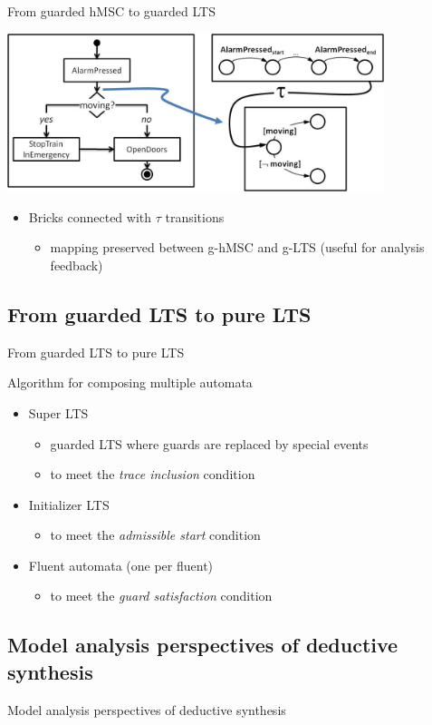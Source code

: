 \begin{frame}{From guarded hMSC to guarded LTS}

  \begin{center}
    \includegraphics[width=11cm]{images/ghmsc2glts_tau.jpg}
  \end{center}
  
  \begin{itemize}
    \item Bricks connected with $\tau$ transitions
    \begin{itemize}
      \item mapping preserved between g-hMSC and g-LTS (useful for analysis feedback)
    \end{itemize}
  \end{itemize}

\end{frame}

\subsection{From guarded LTS to pure LTS}
\begin{frame}{From guarded LTS to pure LTS}

Algorithm for composing multiple automata

\begin{itemize}
\item Super LTS
  \begin{itemize}
    \item guarded LTS where guards are replaced by special events
    \item to meet the \emph{trace inclusion} condition
  \end{itemize}
\item Initializer LTS
  \begin{itemize}
    \item to meet the \emph{admissible start} condition
  \end{itemize}
\item Fluent automata (one per fluent)
  \begin{itemize}
    \item to meet the \emph{guard satisfaction} condition
  \end{itemize}
\end{itemize}

\end{frame}

\subsection{Model analysis perspectives of deductive synthesis}
\begin{frame}{Model analysis perspectives of deductive synthesis}
\end{frame}
